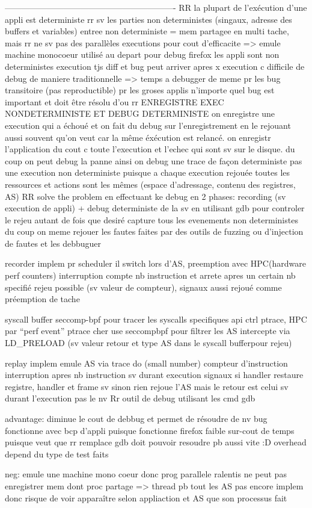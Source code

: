 -------------------------------------------------------------
RR
la plupart de l'exécution d'une appli est deterministe
rr sv les parties non deterministes (singaux, adresse des buffers et variables)
entree non deterministe = mem partagee en multi tache, mais rr ne sv pas des parallèles executions pour cout d'efficacite => emule machine monocoeur
utilisé au depart pour debug firefox
les appli sont non deterministes execution tjs diff et bug peut arriver apres x execution c difficile de debug de maniere traditionnelle => temps a debugger de meme pr les bug transitoire (pas reproductible) pr les groses applis n'importe quel bug est important et doit être résolu d'ou rr
ENREGISTRE EXEC NONDETERMINISTE ET DEBUG DETERMINISTE
on enregistre une execution qui a échoué et on fait du debug sur l'enregistrement en le rejouant aussi souvent qu'on veut car la même éxécution est relancé.
on enregistr l'application du cout c toute l'execution et l'echec qui sont sv sur le disque.  du coup on peut debug la panne
ainsi on debug une trace de façon deterministe pas une execution non deterministe puisque a chaque execution rejouée toutes les ressources et actions sont les mêmes (espace d'adressage, contenu des registres, AS)
RR solve the problem en effectuant ke debug en 2 phases: recording (sv execution de appli) + debug deterministe de la sv en utilisant gdb pour controler le rejeu autant de fois que desiré
capture tous les evenements non deterministes
du coup on meme rejouer les fautes faites par des outils de fuzzing ou d'injection de fautes et les debbuguer

recorder implem
pr scheduler il switch lors d'AS, preemption avec HPC(hardware perf counters) interruption compte nb instruction et arrete apres un certain nb specifié rejeu possible (sv valeur de compteur), signaux aussi rejoué comme préemption de tache

syscall buffer
seccomp-bpf pour tracer les syscalls specifiques
api ctrl ptrace, HPC par ``perf event''
ptrace cher use seccompbpf pour filtrer les AS intercepte via LD\_PRELOAD (sv valeur retour et type AS dans le syscall bufferpour rejeu)

replay implem
emule AS via trace do (small number)
compteur d'instruction interruption apres nb instruction sv durant execution
signaux si handler  restaure registre, handler et frame sv sinon rien
rejoue l'AS mais le retour est celui sv durant l'execution pas le nv
Rr outil de debug utilisant les cmd gdb

advantage:
diminue le cout de debbug et permet de résoudre de nv bug
fonctionne avec bcp d'appli puisque fonctionne firefox
faible sur-cout de temps puisque veut que rr remplace gdb doit pouvoir resoudre pb aussi vite :D overhead depend du type de test faits

neg:
emule une machine mono coeur donc prog parallele ralentis
ne peut pas enregistrer mem dont proc partage => thread pb
tout les AS pas encore implem donc risque de voir apparaître selon appliaction et AS que son processus fait

